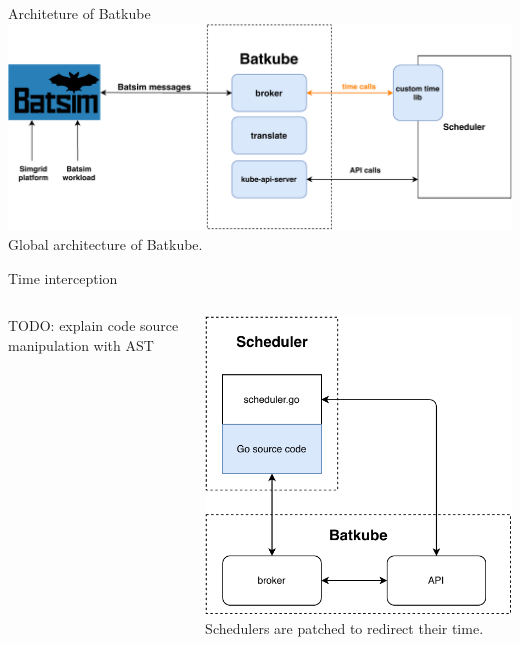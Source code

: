 \documentclass[12pt, aspectratio=43]{beamer}
\begin{document}
\begin{frame}{Architeture of Batkube}
	\centering
	\includegraphics[width=\textwidth]{../imgs/batkube-architecture-3-synchro.pdf}
	\small{Global architecture of Batkube.}
\end{frame}

\begin{frame}{Time interception}
	\begin{columns}
		TODO: explain code source manipulation with AST
		
		\centering
		\includegraphics[width=\textwidth]{../imgs/synchro-go-sources.pdf}\\
		\small{Schedulers are patched to redirect their time.}
	\end{columns}
\end{frame}
\end{document}
